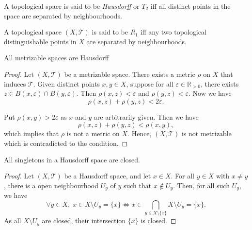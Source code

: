 

\begin{definition}
	\label{def: Hausdorff spaces}
	A topological space is said to be \textit{Hausdorff} or $T_2$ iff all distinct points in the space are separated by neighbourhoods.
\end{definition}


\begin{definition}
	[$R_1$ spaces]
	\label{def: R_1 spaces}
	A topological space $(X, \mathcal T)$ is said to be $R_1$ iff any two topological distinguishable points in $X$ are separated by neighbourhoods.
\end{definition}


\begin{proposition}
	All metrizable spaces are Hausdorff
	
	\begin{proof}
		Let $(X, \mathcal T)$ be a metrizable space. There exists a metric $\rho$ on $X$ that induces $\mathcal T$. Given distinct points $x,y \in X$, suppose for all $\varepsilon \in \mathbb R_{> 0}$, there exists $z \in B(x, \varepsilon) \cap B(y, \varepsilon)$. Then $\rho(x, z) < \varepsilon$ and $\rho(y, z) < \varepsilon$. Now we have
		$$
		\rho(x, z) + \rho(y, z) < 2\varepsilon.
		$$
		
		Put $\rho(x,y) > 2\varepsilon$ as $x$ and $y$ are arbitrarily given. Then we have
		$$
		\rho(x, z) + \rho(y,z) < \rho(x,y),
		$$
		which implies that $\rho$ is not a metric on $X$. Hence, $(X, \mathcal T)$ is not metrizable which is contradicted to the condition.
	\end{proof}
\end{proposition}


\begin{proposition}
	\label{prop: T2 implies T1}
	All singletons in a Hausdorff space are closed.
	
	\begin{proof}
		Let $(X, \mathcal T)$ be a Hausdorff space, and let $x \in X$. For all $y \in X$ with $x \ne y$, there is a open neighbourhood $U_y$ of $y$ such that $x \notin U_y$. Then, for all such $U_y$, we have
		$$
		\forall y \in X, \; x \in X \setminus U_y = \{x\} \iff x \in \bigcap_{y \in X \setminus \{x\}} X \setminus U_y  = \{x\}.
		$$
		As all $X \setminus U_y$ are closed, their intersection $\{x\}$ is closed.
	\end{proof}
\end{proposition}


